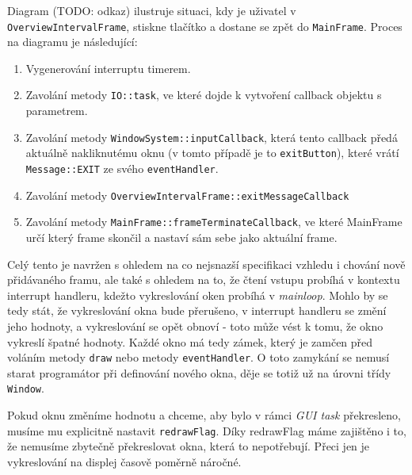 Diagram (TODO: odkaz) ilustruje situaci, kdy je uživatel v \texttt{OverviewIntervalFrame}, stiskne
tlačítko  a dostane se zpět do \texttt{MainFrame}.
Proces na diagramu je následující:
\begin{enumerate}
  \item Vygenerování interruptu timerem.
  \item Zavolání metody \texttt{IO::task}, ve které dojde k vytvoření callback objektu s parametrem.
  \item Zavolání metody \texttt{WindowSystem::inputCallback}, která tento callback předá aktuálně
    nakliknutému oknu (v tomto případě je to \texttt{exitButton}), které vrátí \texttt{Message::EXIT}
    ze svého \texttt{eventHandler}.
  \item Zavolání metody \texttt{OverviewIntervalFrame::exitMessageCallback}
  \item Zavolání metody \texttt{MainFrame::frameTerminateCallback}, ve které MainFrame určí který
    frame skončil a nastaví sám sebe jako aktuální frame.
\end{enumerate}

Celý tento  je navržen s ohledem na co nejsnazší specifikaci vzhledu i chování nově přidávaného
framu, ale také s ohledem na to, že čtení vstupu probíhá v kontextu interrupt handleru, kdežto vykreslování
oken probíhá v \emph{mainloop}.
Mohlo by se tedy stát, že vykreslování okna bude přerušeno, v interrupt handleru se změní jeho hodnoty,
a vykreslování se opět obnoví - toto může vést k tomu, že okno vykreslí špatné hodnoty.
Každé okno má tedy zámek, který je zamčen před voláním metody \texttt{draw} nebo metody \texttt{eventHandler}.
O toto zamykání se nemusí starat programátor při definování nového okna, děje se totiž už na úrovni
třídy \texttt{Window}.

Pokud oknu změníme hodnotu a chceme, aby bylo v rámci \emph{GUI task} překresleno, musíme mu explicitně
nastavit \texttt{redrawFlag}.
Díky redrawFlag máme zajištěno i to, že nemusíme zbytečně překreslovat okna, která to nepotřebují.
Přeci jen je vykreslování na displej časově poměrně náročné.

